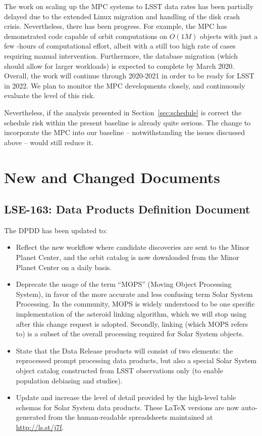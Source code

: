 \documentclass[DM,authoryear,toc]{lsstdoc}
\begin{document}
The work on scaling up the MPC systems to LSST data rates has been partially delayed due to the extended Linux migration and handling of the disk crash crisis. Nevertheless, there has been progress. For example, the MPC has demonstrated code capable of orbit computations on $O(1M)$ objects with just a few -hours of computational effort, albeit with a still too high rate of cases requiring manual intervention. Furthermore, the database migration (which should allow for larger workloads) is expected to complete by March 2020. Overall, the work will continue through 2020-2021 in order to be ready for LSST in 2022. We plan to monitor the MPC developments closely, and continuously evaluate the level of this risk.

Nevertheless, if the analysis presented in Section~\ref{sec:schedule} is correct the schedule risk within the present baseline is already quite serious. The change to incorporate the MPC into our baseline -- notwithstanding the issues discussed above -- would still reduce it.

\section{New and Changed Documents}

\subsection{LSE-163: Data Products Definition Document}

The DPDD has been updated to:
\begin{itemize}
\item Reflect the new workflow where candidate discoveries are sent to the Minor Planet Center, and the orbit catalog is now downloaded from the Minor Planet Center on a daily basis.
\item Deprecate the usage of the term ``MOPS'' (Moving Object Processing System), in favor of the more accurate and less confusing term Solar System Processing. In the community, MOPS is widely understood to be one specific implementation of the asteroid linking algorithm, which we will stop using after this change request is adopted. Secondly, linking (which MOPS refers to) is a subset of the overall processing required for Solar System objects.
\item State that the Data Release products will consist of two elements: the reprocessed prompt processing data products, but also a special Solar System object catalog constructed from LSST observations only (to enable population debiasing and studies).
\item Update and increase the level of detail provided by the high-level table schemas for Solar System data products. These \LaTeX{} versions are now auto-generated from the human-readable spreadsheets maintained at \url{http://ls.st/j7f}.
\end{itemize}
\end{document}
